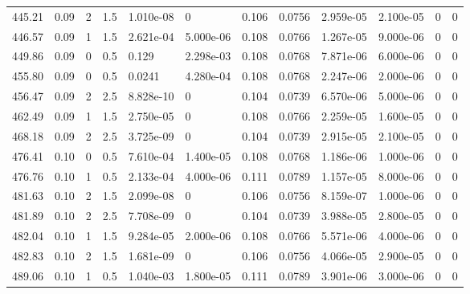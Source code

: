 \documentclass[preview]{standalone}
\begin{document}
{{{\begin{tabular}{L{1.2cm}C{1.2cm} C{0.3cm}C{0.5cm} C{1.4cm}C{1.4cm} C{1.4cm}C{1.4cm} C{1.6cm}C{1.6cm} C{1.6cm}C{1.6cm}}
  445.21  &  0.09  & 2     & 1.5 &  1.010e-08  & 0  &  0.106&   0.0756& 2.959e-05 & 2.100e-05   &  0 & 0  \\ 
  446.57  &  0.09  & 1     & 1.5 &  2.621e-04  & 5.000e-06  &  0.108&   0.0766& 1.267e-05 & 9.000e-06   &  0 & 0  \\ 
  449.86  &  0.09  & 0     & 0.5 &  0.129  & 2.298e-03  &  0.108&   0.0768& 7.871e-06 & 6.000e-06   &  0 & 0  \\ 
  455.80  &  0.09  & 0     & 0.5 &  0.0241  & 4.280e-04  &  0.108&   0.0768& 2.247e-06 & 2.000e-06   &  0 & 0  \\ 
  456.47  &  0.09  & 2     & 2.5 &  8.828e-10  & 0  &  0.104&   0.0739& 6.570e-06 & 5.000e-06   &  0 & 0  \\ 
  462.49  &  0.09  & 1     & 1.5 &  2.750e-05  & 0  &  0.108&   0.0766& 2.259e-05 & 1.600e-05   &  0 & 0  \\ 
  468.18  &  0.09  & 2     & 2.5 &  3.725e-09  & 0  &  0.104&   0.0739& 2.915e-05 & 2.100e-05   &  0 & 0  \\ 
  476.41  &  0.10  & 0     & 0.5 &  7.610e-04  & 1.400e-05  &  0.108&   0.0768& 1.186e-06 & 1.000e-06   &  0 & 0  \\ 
  476.76  &  0.10  & 1     & 0.5 &  2.133e-04  & 4.000e-06  &  0.111&   0.0789& 1.157e-05 & 8.000e-06   &  0 & 0  \\ 
  481.63  &  0.10  & 2     & 1.5 &  2.099e-08  & 0  &  0.106&   0.0756& 8.159e-07 & 1.000e-06   &  0 & 0  \\ 
  481.89  &  0.10  & 2     & 2.5 &  7.708e-09  & 0  &  0.104&   0.0739& 3.988e-05 & 2.800e-05   &  0 & 0  \\ 
  482.04  &  0.10  & 1     & 1.5 &  9.284e-05  & 2.000e-06  &  0.108&   0.0766& 5.571e-06 & 4.000e-06   &  0 & 0  \\ 
  482.83  &  0.10  & 2     & 1.5 &  1.681e-09  & 0  &  0.106&   0.0756& 4.066e-05 & 2.900e-05   &  0 & 0  \\ 
  489.06  &  0.10  & 1     & 0.5 &  1.040e-03  & 1.800e-05  &  0.111&   0.0789& 3.901e-06 & 3.000e-06   &  0 & 0  \\ 
\hline 
\end{tabular} 

}}}
\end{document}
